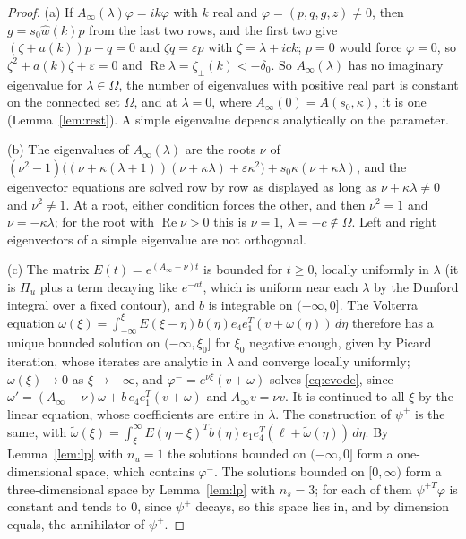 \documentclass[11pt]{article}
\theoremstyle{definition}
\newcommand{\eps}{\varepsilon}
\newcommand{\re}{\operatorname{Re}}
\newcommand{\dz}{\delta_0}
\begin{document}
\begin{proof}
(a) If $A_\infty(\lambda)\varphi = ik\varphi$ with $k$ real and $\varphi = (p, q, g, z) \ne 0$, then $g = s_0\hat w(k)p$ from the last two rows, and the first two give $(\zeta + a(k))p + q = 0$ and $\zeta q = \eps p$ with $\zeta = \lambda + ick$; $p = 0$ would force $\varphi = 0$, so $\zeta^2 + a(k)\zeta + \eps = 0$ and $\re\lambda = \zeta_\pm(k) < -\dz$. So $A_\infty(\lambda)$ has no imaginary eigenvalue for $\lambda \in \Omega$, the number of eigenvalues with positive real part is constant on the connected set $\Omega$, and at $\lambda = 0$, where $A_\infty(0) = A(s_0, \kappa)$, it is one (Lemma~\ref{lem:rest}). A simple eigenvalue depends analytically on the parameter.

(b) The eigenvalues of $A_\infty(\lambda)$ are the roots $\nu$ of $(\nu^2 - 1)\bigl((\nu + \kappa(\lambda + 1))(\nu + \kappa\lambda) + \eps\kappa^2\bigr) + s_0\kappa(\nu + \kappa\lambda)$, and the eigenvector equations are solved row by row as displayed as long as $\nu + \kappa\lambda \ne 0$ and $\nu^2 \ne 1$. At a root, either condition forces the other, and then $\nu^2 = 1$ and $\nu = -\kappa\lambda$; for the root with $\re\nu > 0$ this is $\nu = 1$, $\lambda = -c \notin \Omega$. Left and right eigenvectors of a simple eigenvalue are not orthogonal.

(c) The matrix $E(t) = e^{(A_\infty - \nu)t}$ is bounded for $t \ge 0$, locally uniformly in $\lambda$ (it is $\Pi_u$ plus a term decaying like $e^{-at}$, which is uniform near each $\lambda$ by the Dunford integral over a fixed contour), and $b$ is integrable on $(-\infty, 0]$. The Volterra equation $\omega(\xi) = \int_{-\infty}^{\xi}E(\xi - \eta)b(\eta)e_4e_1^T(v + \omega(\eta))\, d\eta$ therefore has a unique bounded solution on $(-\infty, \xi_0]$ for $\xi_0$ negative enough, given by Picard iteration, whose iterates are analytic in $\lambda$ and converge locally uniformly; $\omega(\xi) \to 0$ as $\xi \to -\infty$, and $\varphi^- = e^{\nu\xi}(v + \omega)$ solves \eqref{eq:evode}, since $\omega' = (A_\infty - \nu)\omega + b\,e_4e_1^T(v + \omega)$ and $A_\infty v = \nu v$. It is continued to all $\xi$ by the linear equation, whose coefficients are entire in $\lambda$. The construction of $\psi^+$ is the same, with $\tilde\omega(\xi) = \int_\xi^\infty E(\eta - \xi)^T b(\eta)e_1e_4^T(\ell + \tilde\omega(\eta))\, d\eta$. By Lemma~\ref{lem:lp} with $n_u = 1$ the solutions bounded on $(-\infty, 0]$ form a one-dimensional space, which contains $\varphi^-$. The solutions bounded on $[0, \infty)$ form a three-dimensional space by Lemma~\ref{lem:lp} with $n_s = 3$; for each of them $\psi^{+T}\varphi$ is constant and tends to $0$, since $\psi^+$ decays, so this space lies in, and by dimension equals, the annihilator of $\psi^+$.


\end{proof}
\end{document}
